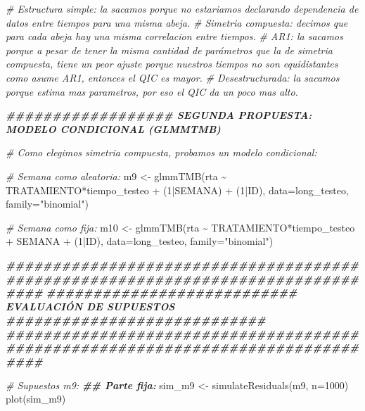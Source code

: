 \documentclass[
]{article}
\newenvironment{Shaded}{\begin{snugshade}}{\end{snugshade}}
\newcommand{\AttributeTok}[1]{\textcolor[rgb]{0.77,0.63,0.00}{#1}}
\newcommand{\CommentTok}[1]{\textcolor[rgb]{0.56,0.35,0.01}{\textit{#1}}}
\newcommand{\DecValTok}[1]{\textcolor[rgb]{0.00,0.00,0.81}{#1}}
\newcommand{\DocumentationTok}[1]{\textcolor[rgb]{0.56,0.35,0.01}{\textbf{\textit{#1}}}}
\newcommand{\FunctionTok}[1]{\textcolor[rgb]{0.00,0.00,0.00}{#1}}
\newcommand{\NormalTok}[1]{#1}
\newcommand{\OtherTok}[1]{\textcolor[rgb]{0.56,0.35,0.01}{#1}}
\newcommand{\SpecialCharTok}[1]{\textcolor[rgb]{0.00,0.00,0.00}{#1}}
\newcommand{\StringTok}[1]{\textcolor[rgb]{0.31,0.60,0.02}{#1}}
\begin{document}
\begin{Shaded}
\begin{Highlighting}[]
\CommentTok{\# Estructura simple: la sacamos porque no estariamos declarando dependencia de datos entre tiempos para una misma abeja.}
\CommentTok{\# Simetria compuesta: decimos que para cada abeja hay una misma correlacion entre tiempos.}
\CommentTok{\# AR1: la sacamos porque a pesar de tener la misma cantidad de parámetros que la de simetria compuesta, tiene un peor ajuste porque nuestros tiempos no son equidistantes como asume AR1, entonces el QIC es mayor.}
\CommentTok{\# Desestructurada: la sacamos porque estima mas parametros, por eso el QIC da un poco mas alto.}

\DocumentationTok{\#\#\#\#\#\#\#\#\#\#\#\#\#\#\#\#\#\# SEGUNDA PROPUESTA: MODELO CONDICIONAL (GLMMTMB)}

\CommentTok{\# Como elegimos simetria compuesta, probamos un modelo condicional:}

\CommentTok{\# Semana como aleatoria:}
\NormalTok{m9 }\OtherTok{\textless{}{-}} \FunctionTok{glmmTMB}\NormalTok{(rta }\SpecialCharTok{\textasciitilde{}}\NormalTok{ TRATAMIENTO}\SpecialCharTok{*}\NormalTok{tiempo\_testeo }\SpecialCharTok{+}\NormalTok{  (}\DecValTok{1}\SpecialCharTok{|}\NormalTok{SEMANA) }\SpecialCharTok{+}\NormalTok{ (}\DecValTok{1}\SpecialCharTok{|}\NormalTok{ID), }\AttributeTok{data=}\NormalTok{long\_testeo, }\AttributeTok{family=}\StringTok{"binomial"}\NormalTok{)}

\CommentTok{\# Semana como fija:}
\NormalTok{m10 }\OtherTok{\textless{}{-}} \FunctionTok{glmmTMB}\NormalTok{(rta }\SpecialCharTok{\textasciitilde{}}\NormalTok{ TRATAMIENTO}\SpecialCharTok{*}\NormalTok{tiempo\_testeo }\SpecialCharTok{+}\NormalTok{ SEMANA }\SpecialCharTok{+}\NormalTok{ (}\DecValTok{1}\SpecialCharTok{|}\NormalTok{ID), }\AttributeTok{data=}\NormalTok{long\_testeo, }\AttributeTok{family=}\StringTok{"binomial"}\NormalTok{)}

\DocumentationTok{\#\#\#\#\#\#\#\#\#\#\#\#\#\#\#\#\#\#\#\#\#\#\#\#\#\#\#\#\#\#\#\#\#\#\#\#\#\#\#\#\#\#\#\#\#\#\#\#\#\#\#\#\#\#\#\#\#\#\#\#\#\#\#\#\#\#\#\#\#\#\#\#\#\#\#\#\#\#\#\#}
\DocumentationTok{\#\#\#\#\#\#\#\#\#\#\#\#\#\#\#\#\#\#\#\#\#\#\#\#\#\#\# EVALUACIÓN DE SUPUESTOS \#\#\#\#\#\#\#\#\#\#\#\#\#\#\#\#\#\#\#\#\#\#\#\#\#\#\#\#}
\DocumentationTok{\#\#\#\#\#\#\#\#\#\#\#\#\#\#\#\#\#\#\#\#\#\#\#\#\#\#\#\#\#\#\#\#\#\#\#\#\#\#\#\#\#\#\#\#\#\#\#\#\#\#\#\#\#\#\#\#\#\#\#\#\#\#\#\#\#\#\#\#\#\#\#\#\#\#\#\#\#\#\#\#}

\CommentTok{\# Supuestos m9:}
\DocumentationTok{\#\# Parte fija:}
\NormalTok{sim\_m9 }\OtherTok{\textless{}{-}} \FunctionTok{simulateResiduals}\NormalTok{(m9, }\AttributeTok{n=}\DecValTok{1000}\NormalTok{)}
\FunctionTok{plot}\NormalTok{(sim\_m9)}
\end{Highlighting}
\end{Shaded}
\end{document}
